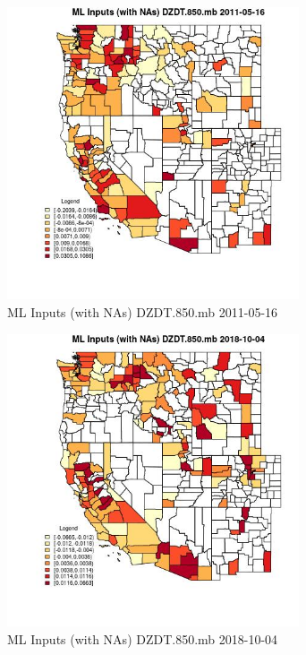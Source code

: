 \begin{figure} 
\centering  
\includegraphics[width=0.77\textwidth]{Code_Outputs/Report_ML_input_PM25_Step4_part_f_de_duplicated_aves_prioritize_24hr_obswNAs_CountyDZDT850mbMean2011-05-16.jpg} 
\caption{\label{fig:Report_ML_input_PM25_Step4_part_f_de_duplicated_aves_prioritize_24hr_obswNAsCountyDZDT850mbMean2011-05-16}ML Inputs (with NAs) DZDT.850.mb 2011-05-16} 
\end{figure} 
 

\begin{figure} 
\centering  
\includegraphics[width=0.77\textwidth]{Code_Outputs/Report_ML_input_PM25_Step4_part_f_de_duplicated_aves_prioritize_24hr_obswNAs_CountyDZDT850mbMean2018-10-04.jpg} 
\caption{\label{fig:Report_ML_input_PM25_Step4_part_f_de_duplicated_aves_prioritize_24hr_obswNAsCountyDZDT850mbMean2018-10-04}ML Inputs (with NAs) DZDT.850.mb 2018-10-04} 
\end{figure} 
 

